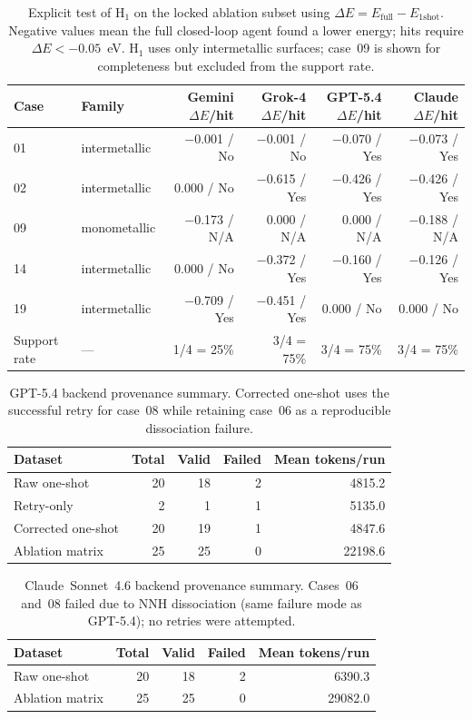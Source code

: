 \begin{table}[t]
\centering
\caption{Explicit test of H$_1$ on the locked ablation subset using $\Delta E = E_{\mathrm{full}} - E_{\mathrm{1shot}}$. Negative values mean the full closed-loop agent found a lower energy; hits require $\Delta E < -0.05$~eV. H$_1$ uses only intermetallic surfaces; case~09 is shown for completeness but excluded from the support rate.}
\label{tab:hypothesis-test}
\begin{tabular}{llrrrr}
\toprule
Case & Family & Gemini $\Delta E$/hit & Grok-4 $\Delta E$/hit & GPT-5.4 $\Delta E$/hit & Claude $\Delta E$/hit \\
\midrule
01 & intermetallic & $-$0.001 / No & $-$0.001 / No & $-$0.070 / Yes & $-$0.073 / Yes \\
02 & intermetallic & 0.000 / No & $-$0.615 / Yes & $-$0.426 / Yes & $-$0.426 / Yes \\
09 & monometallic & $-$0.173 / N/A & 0.000 / N/A & 0.000 / N/A & $-$0.188 / N/A \\
14 & intermetallic & 0.000 / No & $-$0.372 / Yes & $-$0.160 / Yes & $-$0.126 / Yes \\
19 & intermetallic & $-$0.709 / Yes & $-$0.451 / Yes & 0.000 / No & 0.000 / No \\
\midrule
Support rate & --- & 1/4 = 25\% & 3/4 = 75\% & 3/4 = 75\% & 3/4 = 75\% \\
\bottomrule
\end{tabular}
\end{table}

\begin{table}[t]
\centering
\caption{GPT-5.4 backend provenance summary. Corrected one-shot uses the successful retry for case~08 while retaining case~06 as a reproducible dissociation failure.}
\label{tab:gpt54-openai-summary}
\begin{tabular}{lrrrr}
\toprule
Dataset & Total & Valid & Failed & Mean tokens/run \\
\midrule
Raw one-shot & 20 & 18 & 2 & 4815.2 \\
Retry-only & 2 & 1 & 1 & 5135.0 \\
Corrected one-shot & 20 & 19 & 1 & 4847.6 \\
Ablation matrix & 25 & 25 & 0 & 22198.6 \\
\bottomrule
\end{tabular}
\end{table}

\begin{table}[t]
\centering
\caption{Claude~Sonnet~4.6 backend provenance summary. Cases~06 and~08 failed due to NNH dissociation (same failure mode as GPT-5.4); no retries were attempted.}
\label{tab:claude-summary}
\begin{tabular}{lrrrr}
\toprule
Dataset & Total & Valid & Failed & Mean tokens/run \\
\midrule
Raw one-shot & 20 & 18 & 2 & 6390.3 \\
Ablation matrix & 25 & 25 & 0 & 29082.0 \\
\bottomrule
\end{tabular}
\end{table}
